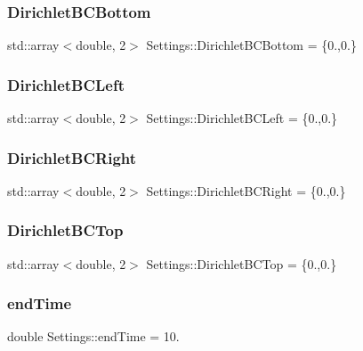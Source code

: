\subsubsection{\texorpdfstring{DirichletBCBottom}{DirichletBCBottom}}
{\footnotesize\ttfamily std\+::array$<$double, 2$>$ Settings\+::\+Dirichlet\+B\+C\+Bottom = \{0.,0.\}}

\mbox{\label{structSettings_aaf2f9565c1f20214e240af235ecbc9ef}} 
\subsubsection{\texorpdfstring{DirichletBCLeft}{DirichletBCLeft}}
{\footnotesize\ttfamily std\+::array$<$double, 2$>$ Settings\+::\+Dirichlet\+B\+C\+Left = \{0.,0.\}}

\mbox{\label{structSettings_af4eaa0cd4601394a6d5c6cbc938c2714}} 
\subsubsection{\texorpdfstring{DirichletBCRight}{DirichletBCRight}}
{\footnotesize\ttfamily std\+::array$<$double, 2$>$ Settings\+::\+Dirichlet\+B\+C\+Right = \{0.,0.\}}

\mbox{\label{structSettings_a3bc8ca94bfe51363a76e9f974b3863f4}} 
\subsubsection{\texorpdfstring{DirichletBCTop}{DirichletBCTop}}
{\footnotesize\ttfamily std\+::array$<$double, 2$>$ Settings\+::\+Dirichlet\+B\+C\+Top = \{0.,0.\}}

\mbox{\label{structSettings_a73cd9110793ede99e9ebe409e5e115fd}} 
\subsubsection{\texorpdfstring{endTime}{endTime}}
{\footnotesize\ttfamily double Settings\+::end\+Time = 10.}

